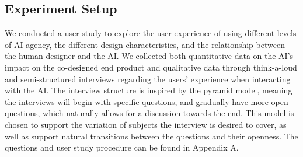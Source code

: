 \begin{table*}[t]
\caption{Summary of the created rooms filtered by the AI version used. The first five values relates to the MAP-Elites dimensions, then the fitness of the rooms, the density and sparsity values for wall (W), enemies (E), and treasures (T), and finally the avg. steps taken to design a room.}
\label{tab:AIavgValues}
\end{table*}

\subsection{Experiment Setup}

We conducted a user study to explore the user experience of using different levels of AI agency, the different design characteristics, and the relationship between the human designer and the AI. We collected both quantitative data on the AI's impact on the co-designed end product and qualitative data through think-a-loud and semi-structured interviews regarding the users' experience when interacting with the AI. The interview structure is inspired by the pyramid model, meaning the interviews will begin with specific questions, and gradually have more open questions, which naturally allows for a discussion towards the end. This model is chosen to support the variation of subjects the interview is desired to cover, as well as support natural transitions between the questions and their openness. The questions and user study procedure can be found in Appendix A. 

